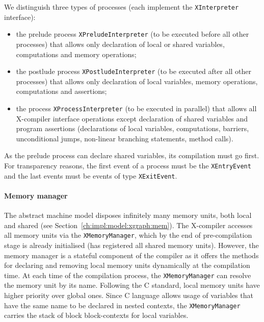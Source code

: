 We distinguish three types of processes (each implement the \texttt{XInterpreter} interface):
\begin{itemize}[noitemsep,topsep=0pt]
\item the prelude process \texttt{XPreludeInterpreter} (to be executed before all other processes) that allows only declaration of local or shared variables, computations and memory operations;
\item the postlude process \texttt{XPostludeInterpreter} (to be executed after all other processes) that allows only declaration of local variables, memory operations, computations and assertions;
\item the process \texttt{XProcessInterpreter} (to be executed in parallel) that allows all X-compiler interface operations except declaration of shared variables %
and program assertions (declarations of local variables, computations, barriers, unconditional jumps, non-linear branching statements, method calls).
\end{itemize}

As the prelude process can declare shared variables, its compilation must go first.
For transparency reasons, the first event of a process must be the \texttt{XEntryEvent} and the last events must be events of type \texttt{XExitEvent}.


\paragraph{Memory manager}
\label{ch:impl:proc:x-compiler:mem}

The \xgraph{} abstract machine model disposes infinitely many memory units, both local and shared (see Section~\ref{ch:impl:model:xgraph:mem}).
The X-compiler accesses all memory units via the \texttt{XMemoryManager}, which by the end of pre-compilation stage is already initialised (has registered all shared memory units).
However, the memory manager is a stateful component of the compiler as it offers the methods for declaring and removing local memory units dynamically at the compilation time.
At each time of the compilation process, the \texttt{XMemoryManager} can resolve the memory unit by its name.
Following the C standard, local memory units have higher priority over global ones.
Since C language allows usage of variables that have the same name to be declared in nested contexts, the \texttt{XMemoryManager} carries the stack of block block-contexts for local variables. %

